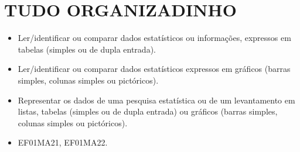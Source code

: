 \chapter{TUDO ORGANIZADINHO}



\begin{itemize}
\item Ler/identificar ou comparar dados estatísticos ou informações,
expressos em tabelas (simples ou de dupla entrada).

\item Ler/identificar ou comparar dados estatísticos expressos em gráficos
(barras simples, colunas simples ou pictóricos).

\item Representar os dados de uma pesquisa estatística ou de um levantamento
em listas, tabelas (simples ou de dupla entrada) ou gráficos (barras
simples, colunas simples ou pictóricos).
\end{itemize}


\begin{itemize}
\item EF01MA21, EF01MA22.
\end{itemize}


